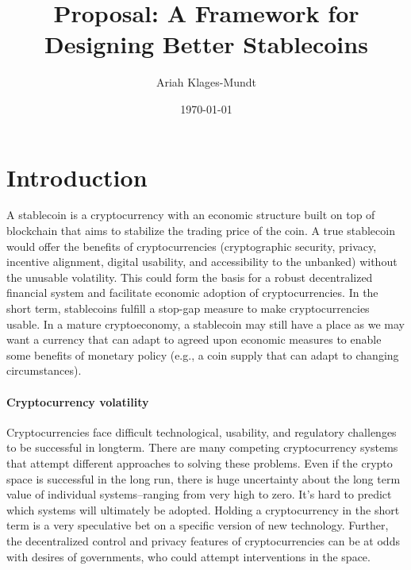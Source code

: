 \documentclass[10pt]{article}
\title{Proposal: A Framework for Designing Better Stablecoins
}
\author{Ariah Klages-Mundt}
\date{\today}
\begin{document}
\maketitle




\section{Introduction}

A stablecoin is a cryptocurrency with an economic structure built on top of blockchain that aims to stabilize the trading price of the coin. A true stablecoin would offer the benefits of cryptocurrencies (cryptographic security, privacy, incentive alignment, digital usability, and accessibility to the unbanked) without the unusable volatility. This could form the basis for a robust decentralized financial system and facilitate economic adoption of cryptocurrencies. In the short term, stablecoins fulfill a stop-gap measure to make cryptocurrencies usable. In a mature cryptoeconomy, a stablecoin may still have a place as we may want a currency that can adapt to agreed upon economic measures to enable some benefits of monetary policy (e.g., a coin supply that can adapt to changing circumstances).


\paragraph{Cryptocurrency volatility}
Cryptocurrencies face difficult technological, usability, and regulatory challenges to be successful in longterm. There are many competing cryptocurrency systems that attempt different approaches to solving these problems. Even if the crypto space is successful in the long run, there is huge uncertainty about the long term value of individual systems--ranging from very high to zero. It's hard to predict which systems will ultimately be adopted. Holding a cryptocurrency in the short term is a very speculative bet on a specific version of new technology. Further, the decentralized control and privacy features of cryptocurrencies can be at odds with desires of governments, who could attempt interventions in the space.
\end{document}
